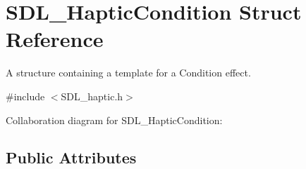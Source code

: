 \hypertarget{struct_s_d_l___haptic_condition}{}\section{S\+D\+L\+\_\+\+Haptic\+Condition Struct Reference}
\label{struct_s_d_l___haptic_condition}


A structure containing a template for a Condition effect.  




{\ttfamily \#include $<$S\+D\+L\+\_\+haptic.\+h$>$}



Collaboration diagram for S\+D\+L\+\_\+\+Haptic\+Condition\+:
\subsection*{Public Attributes}
